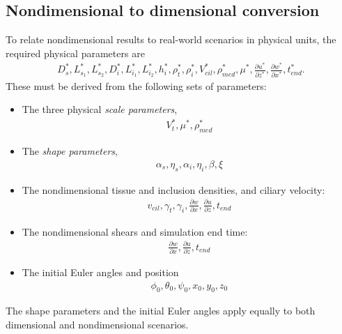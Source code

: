 \documentclass[10pt,a4paper]{article}
\def\non{\nonumber}
\def\p{\partial}
\begin{document}
\newpage 
\subsection{Nondimensional to dimensional conversion}
To relate nondimensional results to real-world scenarios in physical units, the required physical parameters are
\begin{eqnarray}\label{nd2dpars0}
	D^*_s, L^*_{s_1}, L^*_{s_2}, D^*_{i}, L^*_{i_1}, L^*_{i_2}, h^*_i, \rho^*_t, \rho^*_{i}, V^*_{cil}, \rho^*_{med}, \mu^*, \frac{\p u^*}{\p z^*}, \frac{\p w^*}{\p x^*}, t^*_{end}.
\end{eqnarray}
These must be derived from the following sets of parameters:
\begin{itemize}
	\item The three physical \textit{scale parameters},
		\begin{eqnarray}\label{nd2dpars0a}
			V_t^*, \mu^*, \rho^*_{med}	
		\end{eqnarray}
	\item The \textit{shape parameters}, 
		\begin{eqnarray}\label{nd2dpars2}
			\alpha_s, \eta_s, \alpha_{i}, \eta_{i}, \beta, \xi
		\end{eqnarray}
	\item The nondimensional tissue and inclusion densities, and ciliary velocity:
		\begin{eqnarray}\label{nd2dpars1a}
			v_{cil}, \gamma_t, \gamma_i, \frac{\p w}{\p x}, \frac{\p u}{\p z}, t_{end}
		\end{eqnarray}
	\item The nondimensional shears and simulation end time:
		\begin{eqnarray}\label{nd2dpars1b}
			\frac{\p w}{\p x}, \frac{\p u}{\p z}, t_{end}
		\end{eqnarray}
	\item The initial Euler angles and position
		\begin{eqnarray}\label{nd2dpars2a}
			\phi_0, \theta_0, \psi_0, x_0, y_0, z_0
		\end{eqnarray}	 	
\end{itemize}
The shape parameters and the initial Euler angles apply equally to both dimensional and nondimensional scenarios.
\end{document}
